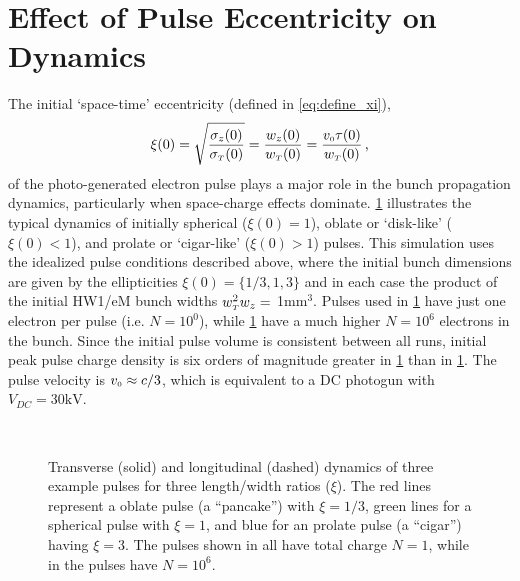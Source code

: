 
\section{Effect of Pulse Eccentricity on Dynamics} \label{sec:initial_shapes}

The initial `space-time' eccentricity (defined in \ref{eq:define_xi}),
\begin{equation}
  \xi ( 0 ) = \sqrt{ \frac{ \sigma_{z}(0) }{ \sigma_{{\scriptscriptstyle T}}(0) } } = \frac{ w_z(0) }{ w_{{\scriptscriptstyle T}}(0) } = \frac{ v_{{\scriptscriptstyle 0}} \tau(0) }{ w_{{\scriptscriptstyle T}}(0) } \,\text{,}
\end{equation}
of the photo-generated electron pulse plays a major role in the bunch propagation dynamics, particularly when space-charge effects dominate.
\ref{fig:compare_shape} illustrates the typical dynamics of initially spherical ($ \xi(0) = 1 $), oblate or `disk-like' ($ \xi(0) < 1 $), and prolate or `cigar-like' ($ \xi(0) > 1 $) pulses.
This simulation uses the idealized pulse conditions described above, where the initial bunch dimensions are given by the ellipticities $ \xi(0) = \{ 1/3 , 1 , 3 \} $ and in each case the product of the initial HW1/eM bunch widths $w_{{\scriptscriptstyle T}}^2 w_z = $ 1mm$^3$.
Pulses used in \ref{fig:compare_shape} have just one electron per pulse (i.e. $ N = 10^{0} $), while \ref{fig:compare_shape} have a much higher $ N = 10^{6} $ electrons in the bunch.
Since the initial pulse volume is consistent between all runs, initial peak pulse charge density is six orders of magnitude greater in \ref{fig:compare_shape} than in \ref{fig:compare_shape}.
The pulse velocity is $ v_{{\scriptscriptstyle 0}} \approx c/3 $, which is equivalent to a DC photogun with $V_{DC} = 30\text{kV} $.

\begin{figure}
  \centering
  \subfloat[][]{
    \label{fig:compare_shape_N1}
    
  }
  \\
  \subfloat[][]{
    \label{fig:compare_shape_N1e6}
    
  }
  \caption[AG simulation of free-space pulse expansion]{
    Transverse (solid) and longitudinal (dashed) dynamics of three example pulses for three length/width ratios ($\xi$). 
    The red lines represent a oblate pulse (a ``pancake'') with $\xi=1/3$, green lines for a spherical pulse with $\xi=1$, and blue for an prolate pulse (a ``cigar'') having $\xi=3$.
    The pulses shown in  all have total charge $N=1$, while in  the pulses have $N=10^6$.
  }
  \label{fig:compare_shape}
\end{figure}

